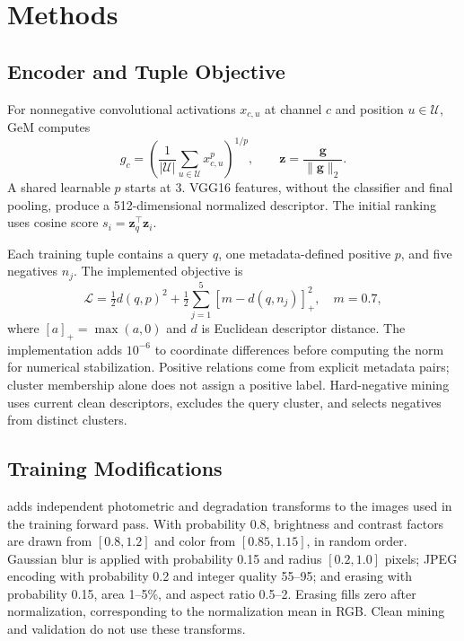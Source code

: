 \section{Methods}
\subsection{Encoder and Tuple Objective}
For nonnegative convolutional activations $x_{c,u}$ at channel $c$ and position $u\in\mathcal U$, GeM computes
\begin{equation}
 g_c=\left(\frac{1}{|\mathcal U|}\sum_{u\in\mathcal U}x_{c,u}^{p}\right)^{1/p},
 \qquad \mathbf z=\frac{\mathbf g}{\|\mathbf g\|_2}.
\end{equation}
A shared learnable $p$ starts at 3. VGG16 features, without the classifier and final pooling, produce a 512-dimensional normalized descriptor. The initial ranking uses cosine score $s_i=\mathbf z_q^\top\mathbf z_i$.

Each training tuple contains a query $q$, one metadata-defined positive $p$, and five negatives $n_j$. The implemented objective is
\begin{equation}
 \mathcal L=\tfrac12 d(q,p)^2+\tfrac12\sum_{j=1}^{5}[m-d(q,n_j)]_+^2,
 \quad m=0.7,
\end{equation}
where $[a]_+=\max(a,0)$ and $d$ is Euclidean descriptor distance. The implementation adds $10^{-6}$ to coordinate differences before computing the norm for numerical stabilization. Positive relations come from explicit metadata pairs; cluster membership alone does not assign a positive label. Hard-negative mining uses current clean descriptors, excludes the query cluster, and selects negatives from distinct clusters.

\subsection{Training Modifications}
\Rone{} adds independent photometric and degradation transforms to the images used in the training forward pass. With probability 0.8, brightness and contrast factors are drawn from $[0.8,1.2]$ and color from $[0.85,1.15]$, in random order. Gaussian blur is applied with probability 0.15 and radius $[0.2,1.0]$ pixels; JPEG encoding with probability 0.2 and integer quality 55--95; and erasing with probability 0.15, area 1--5\%, and aspect ratio 0.5--2. Erasing fills zero after normalization, corresponding to the normalization mean in RGB. Clean mining and validation do not use these transforms.

